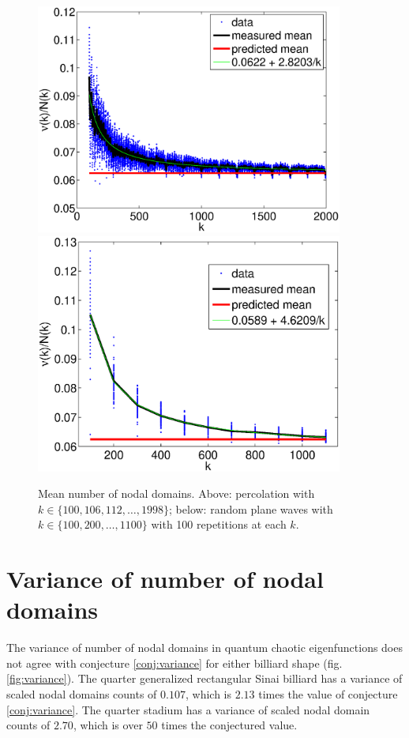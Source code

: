 \documentclass{report}
\begin{document}
\begin{figure}
  \begin{center}
    \includegraphics[width=0.9\textwidth]{figs/results/perc_100_to_2000_mean.eps}
    \includegraphics[width=0.9\textwidth]{figs/results/rpw_all_mean.eps}
    \caption{Mean number of nodal domains. Above: percolation with $k \in \{100, 106, 112, \ldots, 1998\}$; below: random plane waves with $k \in \{100, 200, \ldots, 1100\}$ with 100 repetitions at each $k$.}
  \end{center}
\end{figure}

\section{Variance of number of nodal domains}
The variance of number of nodal domains in quantum chaotic eigenfunctions does not agree with conjecture \ref{conj:variance} for either billiard shape (fig. \ref{fig:variance}). The quarter generalized rectangular Sinai billiard has a variance of scaled nodal domains counts of $0.107$, which is $2.13$ times the value of conjecture \ref{conj:variance}. The quarter stadium has a variance of scaled nodal domain counts of $2.70$, which is over $50$ times the conjectured value.
\end{document}
